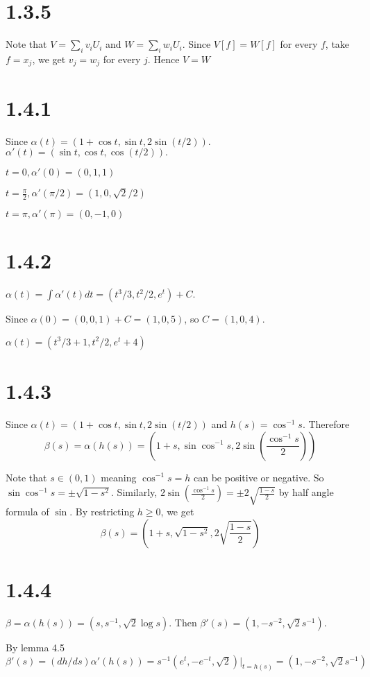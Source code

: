 \documentclass[12pt]{article}
\begin{document}
\section*{1.3.5}
Note that $V= \sum_i v_i U_i$ and $W = \sum_i w_i U_i$. Since $V[f]= W[f]$ for every $f$,  take $f= x_j$, we get $v_j = w_j$ for every $j$. Hence $V = W$ \QED

\section*{1.4.1}
Since $\alpha(t) = (1 + \cos t, \sin t, 2\sin (t/2))$. $\alpha'(t) = (\sin t, \cos t, \cos(t/2)).$

$t = 0, \alpha'(0) = (0, 1, 1)$ 

$t = \frac{\pi}{2}, \alpha'(\pi/2) = (1, 0, \sqrt{2}/2)$

$t = \pi, \alpha'(\pi) = (0, -1, 0)$

\section*{1.4.2}
$\alpha(t) = \int \alpha'(t) dt = (t^3/3, t^2/2, e^t) + C$.

Since $\alpha(0) = (0, 0, 1) + C = (1, 0, 5)$, so $C = (1, 0, 4)$.

$\alpha(t) = (t^3/3 + 1, t^2/2, e^t + 4)$

\section*{1.4.3}
Since $\alpha(t) = (1 + \cos t, \sin t, 2\sin (t/2))$ and $h(s) = \cos^{-1} s$. Therefore $$\beta(s) = \alpha(h(s)) = \left(1 + s, \sin \cos^{-1} s, 2 \sin(\frac{\cos^{-1} s}{2}) \right) $$

Note that $s \in (0, 1)$ meaning $\cos^{-1}s = h$ can be positive or negative. So $ \sin \cos^{-1} s  = \pm \sqrt{1 - s^2}$. Similarly, $2 \sin(\frac{\cos^{-1} s}{2}) = \pm 2\sqrt{\frac{1 - s}{2}}$ by half angle formula of $\sin$. By restricting $h \geq 0$, we get 
$$\beta(s) = \left(1 + s, \sqrt{1 - s^2}, 2\sqrt{\frac{1 - s}{2}} \right)$$

\section*{1.4.4}
$\beta = \alpha(h(s)) = (s, s^{-1}, \sqrt{2}\log s)$. Then $\beta'(s) = (1, -s^{-2}, \sqrt{2} s^{-1})$.

By lemma 4.5 $\beta'(s) = (dh/ds) \alpha'(h(s)) = s^{-1}(e^t, -e^{-t}, \sqrt{2})|_{t=h(s)} = (1, -s^{-2}, \sqrt{2} s^{-1})$
\end{document}

